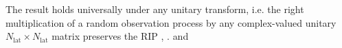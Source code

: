 {  %
  The result holds universally under any
  unitary transform, i.e.
  the right multiplication of
  a random observation process by
  any complex-valued unitary
  $N_{\text{lat}} \times N_{\text{lat}}$ matrix preserves
  the \ac{RIP}
  \cite[222]{coll:Fornasier2015},
  \cite[Sect. 6]{article:BaraniukCA2008}.
} and
